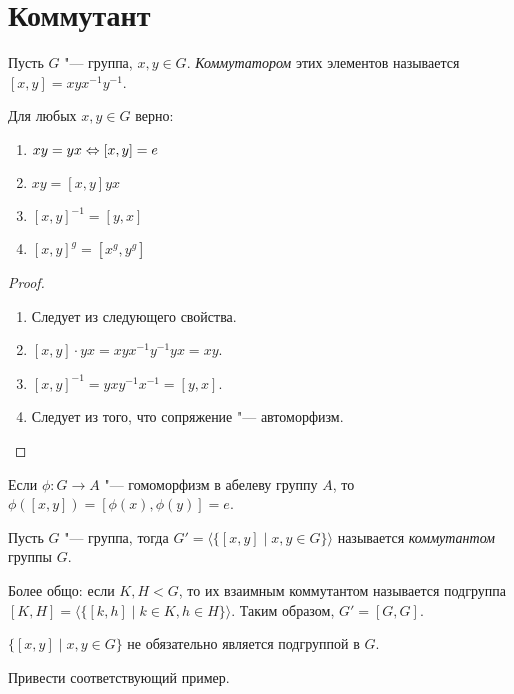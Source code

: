 \documentclass[main]{subfiles}
\begin{document}
\section{Коммутант}
\begin{definition}
  Пусть \( G \) "--- группа, \( x, y \in G \).
  \emph{Коммутатором} этих элементов
  называется \( [x, y] = xyx^{-1}y^{-1} \).
\end{definition}

\begin{proposition}
  Для любых \( x, y \in G \) верно:
  \begin{enumerate}
    \item \( xy = yx \Leftrightarrow [x, y] = e \)
    \item \( xy = [x, y] yx \)
    \item \( [x, y]^{-1} = [y, x] \)
    \item \( [x, y]^g = [x^g, y^g] \)
  \end{enumerate}
\end{proposition}
\begin{proof}~
  \begin{enumerate}
    \item Следует из следующего свойства.
    \item \( [x, y] \cdot yx = xy x^{-1} y^{-1} yx = xy \).
    \item \( [x, y]^{-1} = y x y^{-1} x^{-1} = [y, x] \).
    \item Следует из того, что сопряжение "--- автоморфизм.
  \end{enumerate}
\end{proof}

\begin{remark}
  Если \( \phi : G \to A \) "--- гомоморфизм
  в абелеву группу \( A \), то
  \( \phi([x, y]) = [\phi(x), \phi(y)] = e \).
\end{remark}

\begin{definition}
  Пусть \( G \) "--- группа, тогда
  \( G' = \langle \{ [x, y] \mid x, y \in G \} \rangle \)
  называется \emph{коммутантом} группы \( G \).
\end{definition}

Более общо: если \( K, H < G \), то
их взаимным коммутантом называется
подгруппа \( [K, H] = \langle
\{ [k, h] \mid k \in K, h \in H \} \rangle \).
Таким образом, \( G' = [G, G] \).

\begin{remark}
  \( \{ [x, y] \mid x, y \in G \} \) не обязательно
  является подгруппой в \( G \).
\end{remark}
\begin{exercise}
  Привести соответствующий пример.
\end{exercise}
\end{document}
